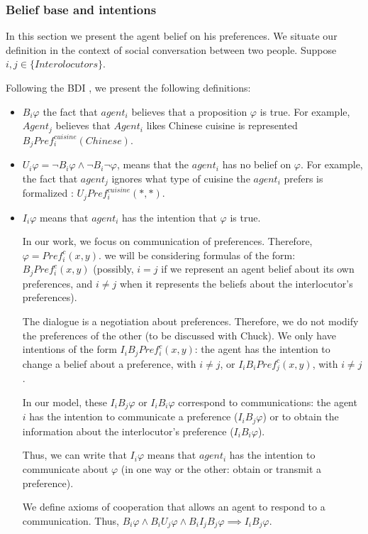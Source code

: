 \documentclass{llncs}
\begin{document}
\subsubsection{Belief base and intentions}
In this section we present the agent belief on his preferences. We situate our definition in the context of social conversation between two people. Suppose $i,j \in \{Interolocutors\}$.
\par Following the BDI \cite{rao1991modeling}, we present the following definitions:
\begin{itemize}
	\item  $ B_{i} \varphi$ the fact that $agent_{i}$  believes that a proposition $\varphi$ is true. For example, $Agent_j$ believes that $Agent_{i}$ likes Chinese cuisine is represented $ B_{j} Pref_{i}^{cuisine}(Chinese)$.
	\item  $U_{i} \varphi = \neg B_{i} \varphi \land \neg B_{i} \neg \varphi$, means that the $agent_{i}$ has no belief on $\varphi$.  For example, the fact that $agent_{j}$ ignores what type of cuisine the $agent_{i}$ prefers is formalized : $U_{j} Pref_{i}^{cuisine}(*,*)$.
	\item $I_{i} \varphi$ means that  $agent_i$ has the intention that $\varphi$ is true.

	In our work, we focus on communication of preferences. Therefore, $\varphi = Pref_i^c(x,y)$. we will be considering formulas of the form: $B_j Pref_i^c(x,y)$ (possibly, $i=j$ if we represent an agent belief about its own preferences, and $i\neq j$ when it represents the beliefs about the interlocutor's preferences).
	
	The dialogue is a negotiation about preferences. Therefore, we do not modify the preferences of the other (to be discussed with Chuck). We only have intentions of the form $I_i B_j Pref_i^c(x,y)$: the agent has the intention to change a belief about a preference, with $i\neq j$, or $I_i B_i Pref_j^c(x,y)$, with $i\neq j$.
	
	In our model, these $I_i B_j \varphi$ or $I_i B_i \varphi$ correspond to communications: the agent $i$ has the intention to communicate a preference ($I_i B_j \varphi$) or to obtain the information about the interlocutor's preference ($I_i B_i \varphi$). 
	
	Thus, we can write that $I_{i} \varphi$ means that  $agent_i$ has the intention to communicate about $\varphi$ (in one way or the other: obtain or transmit a preference).
	
	We define axioms of cooperation that allows an agent to respond to a communication. Thus, $ B_{i} \varphi \land  B_{i} U_{j} \varphi \land  B_{i} I_{j}  B_{j} \varphi \implies I_{i}  B_{j} \varphi  $.
	

\end{itemize}
\end{document}
